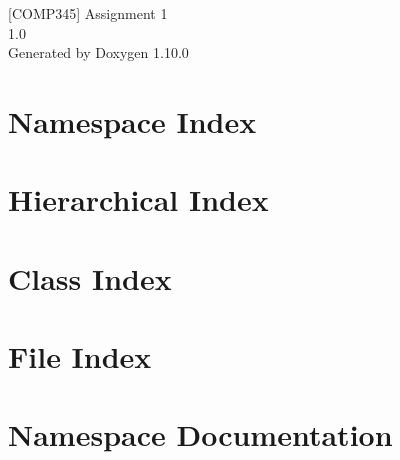 \documentclass[twoside]{book}
\newcommand{\+}{\discretionary{\mbox{\scriptsize$\hookleftarrow$}}{}{}}
\newcommand{\clearemptydoublepage}{%
    \newpage{\pagestyle{empty}\cleardoublepage}%
  }
\begin{document}
  \raggedbottom
    \hypersetup{pageanchor=false,
                bookmarksnumbered=true,
                pdfencoding=unicode
               }
  \begin{titlepage}
  \vspace*{7cm}
  \begin{center}%
  {\Large \mbox{[}\+COMP345\mbox{]} Assignment 1}\\
  [1ex]\large 1.\+0 \\
  \vspace*{1cm}
  {\large Generated by Doxygen 1.10.0}\\
  \end{center}
  \end{titlepage}
  \clearemptydoublepage
  \tableofcontents
  \clearemptydoublepage
  \hypersetup{pageanchor=true}
\chapter{Namespace Index}

\chapter{Hierarchical Index}

\chapter{Class Index}

\chapter{File Index}

\chapter{Namespace Documentation}























\end{document}
